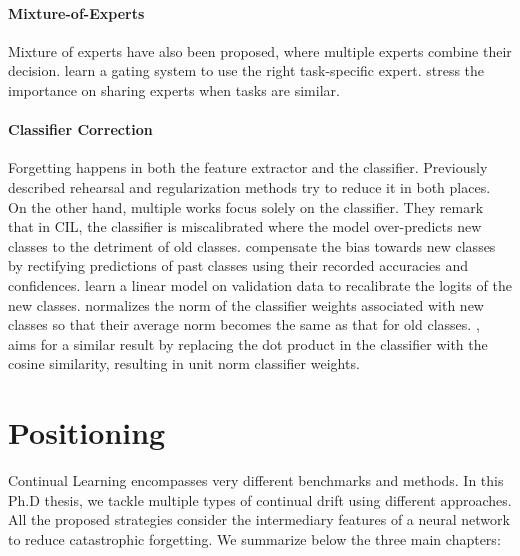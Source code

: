 \paragraph{Mixture-of-Experts} Mixture of experts \citep{masoudnia2014mixture} have also been
proposed, where multiple experts combine their decision. \citet{aljundi2017experts} learn a gating
system to use the right task-specific expert. \citet{collier2020routingnetwork} stress the importance
on sharing experts when tasks are similar.

\paragraph{Classifier Correction} Forgetting happens in both the feature extractor and the
classifier. Previously described rehearsal and regularization methods try to reduce it in both
places. On the other hand, multiple works focus solely on the classifier. They remark that in
\acf{CIL}, the classifier is miscalibrated \citep{guo2017miscalibration} where the model
over-predicts new classes to the detriment of old classes. \citet{belouadah2019il2m} compensate the
bias towards new classes by rectifying predictions of past classes using their recorded accuracies
and confidences. \citet{wu2019bias_correction} learn a linear model on validation data to recalibrate
the logits of the new classes. \citet{zhao2020weightalignement} normalizes the norm of the classifier
weights associated with new classes so that their average norm becomes the same as that for old
classes. \citet{hou2019ucir}, aims for a similar result by replacing the dot product in the
classifier with the cosine similarity, resulting in unit norm classifier weights.

\section{Positioning}

Continual Learning encompasses very different benchmarks and methods. In this Ph.D thesis, we tackle
multiple types of continual drift using different approaches. All the proposed strategies consider
the intermediary features of a neural network to reduce catastrophic forgetting. We summarize
below the three main chapters:

